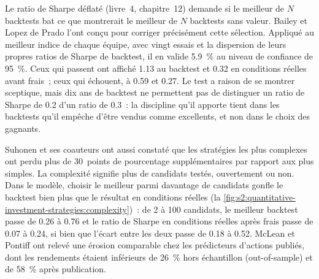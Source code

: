 \begin{omfigure}

\label{fig:s2:quantitative-investment-strategies:path}
\end{omfigure}

Le ratio de Sharpe déflaté (livre~4, chapitre~12) demande si le meilleur de $N$ backtests bat ce que montrerait le meilleur de $N$ backtests sans valeur. Bailey et
Lopez de Prado l'ont conçu pour corriger précisément cette sélection. Appliqué au meilleur indice de chaque équipe, avec vingt essais et la dispersion de leurs propres
ratios de Sharpe de backtest, il en valide 5.9~\% au niveau de confiance de 95~\%. Ceux qui passent ont affiché 1.13 au backtest et 0.32 en conditions réelles avant frais~; ceux qui échouent,
à 0.59 et 0.27. Le test a raison de se montrer sceptique, mais dix ans de backtest ne permettent pas de distinguer un ratio de Sharpe de 0.2 d'un ratio de 0.3~: la discipline qu'il apporte
tient dans les backtests qu'il empêche d'être vendus comme excellents, et non dans le choix des gagnants.

Suhonen et ses coauteurs ont aussi constaté que les stratégies les plus complexes ont perdu plus de 30~points de pourcentage supplémentaires par rapport aux plus simples. La complexité signifie plus de
candidats testés, ouvertement ou non. Dans le modèle, choisir le meilleur parmi davantage de candidats gonfle le backtest bien plus que le résultat en conditions réelles
(la \cref{fig:s2:quantitative-investment-strategies:complexity})~: de 2 à 100 candidats, le meilleur backtest passe de 0.26 à 0.76 et le ratio de Sharpe
en conditions réelles après frais passe de 0.07 à 0.24, si bien que l'écart entre les deux passe de 0.18 à 0.52. McLean et Pontiff ont relevé une érosion comparable chez les prédicteurs d'actions
publiés, dont les rendements étaient inférieurs de 26~\% hors échantillon (out-of-sample) et de 58~\% après publication.

